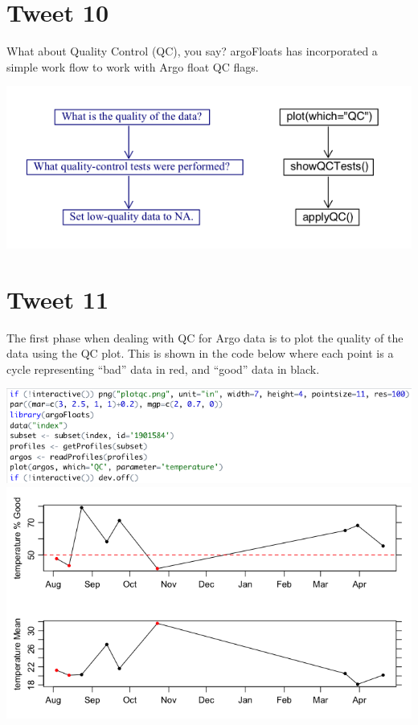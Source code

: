 \documentclass[
]{article}
\begin{document}
\hypertarget{tweet-10}{%
\section{Tweet 10}\label{tweet-10}}

What about Quality Control (QC), you say? argoFloats has incorporated a
simple work flow to work with Argo float QC flags.

\includegraphics{../../../vignettes/qc_flowchart.png}

\hypertarget{tweet-11}{%
\section{Tweet 11}\label{tweet-11}}

The first phase when dealing with QC for Argo data is to plot the
quality of the data using the QC plot. This is shown in the code below
where each point is a cycle representing ``bad'' data in red, and
``good'' data in black.

\includegraphics{../18_tweets/plotQCCode.png}
\includegraphics{../../../vignettes/plotqc.png}
\end{document}
